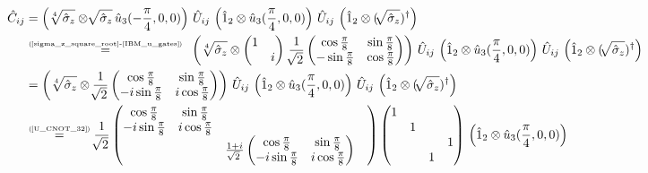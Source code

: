 \documentclass[11pt]{article}
\numberwithin{equation}{section} %
\numberwithin{figure}{section} %
\newcommand\numeq[1] %
  {\stackrel{\scriptscriptstyle(\mkern-1.5mu#1\mkern-1.5mu)}{=}}
\begin{document}
\begin{appendices}
\begin{equation} \label{proof_controlled_not_root}
\begin{split}
\hat{C}_{ij}
&	= \left( \sqrt[4]{\hat{\sigma}_z}\otimes\sqrt[]{\hat{\sigma}_z}\, \hat{u}_3(-\frac{\pi}{4},0,0) \right)\,\hat{U}_{ij}\, \left(\hat{1}_2\otimes\hat{u}_3(\frac{\pi}{4},0,0)\right)\,\hat{U}_{ij}\,	\left(\hat{1}_2\otimes(\sqrt[]{\hat{\sigma}_z})^\dagger\right)\\
&	\numeq{\textrm{\ref{sigma_z_square_root}-\ref{IBM_u_gates}}} \,\,\, \left( \sqrt[4]{\hat{\sigma}_z}\otimes\begin{pmatrix}1&\\&i\end{pmatrix}\, \frac{1}{\sqrt[]{2}}\begin{pmatrix} \cos\frac{\pi}{8}&\sin\frac{\pi}{8}\\-\sin\frac{\pi}{8}&\cos\frac{\pi}{8} \end{pmatrix}  \right)\,\hat{U}_{ij}\, \left(\hat{1}_2\otimes\hat{u}_3(\frac{\pi}{4},0,0)\right)\,\hat{U}_{ij}\,	\left(\hat{1}_2\otimes(\sqrt[]{\hat{\sigma}_z})^\dagger\right)\\
&	= \left( \sqrt[4]{\hat{\sigma}_z}\otimes\frac{1}{\sqrt[]{2}}\begin{pmatrix} \cos\frac{\pi}{8}&\sin\frac{\pi}{8}\\-i\sin\frac{\pi}{8}&i\cos\frac{\pi}{8} \end{pmatrix}  \right)\,\hat{U}_{ij}\, \left(\hat{1}_2\otimes\hat{u}_3(\frac{\pi}{4},0,0)\right)\,\hat{U}_{ij}\,	\left(\hat{1}_2\otimes(\sqrt[]{\hat{\sigma}_z})^\dagger\right)\\
&	\numeq{\textrm{\ref{U_CNOT_32}}} \frac{1}{\sqrt[]{2}}\begin{pmatrix} \cos\frac{\pi}{8}&\sin\frac{\pi}{8}&&\\-i\sin\frac{\pi}{8}&i\cos\frac{\pi}{8}&&\\ &&\frac{1+i}{\sqrt[]{2}} \begin{pmatrix} \cos\frac{\pi}{8}&\sin\frac{\pi}{8}\\-i\sin\frac{\pi}{8}&i\cos\frac{\pi}{8} \end{pmatrix} \end{pmatrix} \begin{pmatrix} 1&&&\\ &1&&\\ &&&1\\ &&1&\end{pmatrix}\, \left(\hat{1}_2\otimes\hat{u}_3(\frac{\pi}{4},0,0)\right)\, \\

\end{split}
\end{equation}
\end{appendices}
\end{document}
